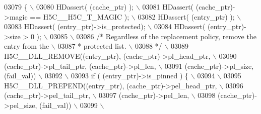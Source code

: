 \begin{DoxyCode}
03079 \textcolor{preprocessor}{\{                                                                          \(\backslash\)}
03080 \textcolor{preprocessor}{    HDassert( (cache\_ptr) );                                               \(\backslash\)}
03081 \textcolor{preprocessor}{    HDassert( (cache\_ptr)->magic == H5C\_\_H5C\_T\_MAGIC );                    \(\backslash\)}
03082 \textcolor{preprocessor}{    HDassert( (entry\_ptr) );                                               \(\backslash\)}
03083 \textcolor{preprocessor}{    HDassert( (entry\_ptr)->is\_protected);                                  \(\backslash\)}
03084 \textcolor{preprocessor}{    HDassert( (entry\_ptr)->size > 0 );                                     \(\backslash\)}
03085 \textcolor{preprocessor}{                                                                           \(\backslash\)}
03086 \textcolor{preprocessor}{    }\textcolor{comment}{/* Regardless of the replacement policy, remove the entry from the     \(\backslash\)}
03087 \textcolor{comment}{     * protected list.                                                     \(\backslash\)}
03088 \textcolor{comment}{     */}\textcolor{preprocessor}{                                                                    \(\backslash\)}
03089 \textcolor{preprocessor}{    H5C\_\_DLL\_REMOVE((entry\_ptr), (cache\_ptr)->pl\_head\_ptr,                 \(\backslash\)}
03090 \textcolor{preprocessor}{                    (cache\_ptr)->pl\_tail\_ptr, (cache\_ptr)->pl\_len,         \(\backslash\)}
03091 \textcolor{preprocessor}{                    (cache\_ptr)->pl\_size, (fail\_val))                      \(\backslash\)}
03092 \textcolor{preprocessor}{                                                                           \(\backslash\)}
03093 \textcolor{preprocessor}{    if ( (entry\_ptr)->is\_pinned ) \{                                        \(\backslash\)}
03094 \textcolor{preprocessor}{                                                                           \(\backslash\)}
03095 \textcolor{preprocessor}{        H5C\_\_DLL\_PREPEND((entry\_ptr), (cache\_ptr)->pel\_head\_ptr,           \(\backslash\)}
03096 \textcolor{preprocessor}{                         (cache\_ptr)->pel\_tail\_ptr,                        \(\backslash\)}
03097 \textcolor{preprocessor}{                         (cache\_ptr)->pel\_len,                             \(\backslash\)}
03098 \textcolor{preprocessor}{                         (cache\_ptr)->pel\_size, (fail\_val))                \(\backslash\)}
03099 \textcolor{preprocessor}{                                                                           \(\backslash\)}

\end{DoxyCode}
